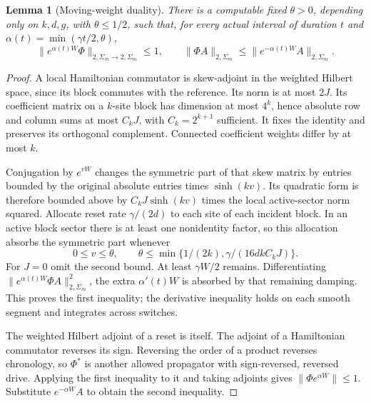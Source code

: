\documentclass[11pt,reqno]{amsart}
\numberwithin{equation}{section}
\newtheorem{lemma}[theorem]{Lemma}
\theoremstyle{definition}
\theoremstyle{remark}
\newcommand{\nn}[1]{\lVert#1\rVert}
\begin{document}
\begin{lemma}[Moving-weight duality]\label{lem:weight}
There is a computable fixed $\theta>0$, depending only on $k,d,g$, with $\theta\leq1/2$, such that, for every actual interval of duration $t$ and $\alpha(t)=\min(\gamma t/2,\theta)$,
\begin{equation}\label{eq:weight}
 \nn{e^{\alpha(t)W}\Phi}_{2,\Sigma_m\to2,\Sigma_m}\leq1,
 \qquad
 \nn{\Phi A}_{2,\Sigma_m}\leq\nn{e^{-\alpha(t)W}A}_{2,\Sigma_m}.
\end{equation}
\end{lemma}
\begin{proof}
A local Hamiltonian commutator is skew-adjoint in the weighted Hilbert space, since its block commutes with the reference. Its norm is at most $2J$. Its coefficient matrix on a $k$-site block has dimension at most $4^k$, hence absolute row and column sums at most $C_kJ$, with $C_k=2^{k+1}$ sufficient. It fixes the identity and preserves its orthogonal complement. Connected coefficient weights differ by at most $k$.

Conjugation by $e^{vW}$ changes the symmetric part of that skew matrix by entries bounded by the original absolute entries times $\sinh(kv)$. Its quadratic form is therefore bounded above by $C_kJ\sinh(kv)$ times the local active-sector norm squared. Allocate reset rate $\gamma/(2d)$ to each site of each incident block. In an active block sector there is at least one nonidentity factor, so this allocation absorbs the symmetric part whenever
\[
 0\leq v\leq\theta,\qquad
 \theta\leq\min\{1/(2k),\gamma/(16dkC_kJ)\}.
\]
For $J=0$ omit the second bound. At least $\gamma W/2$ remains. Differentiating $\nn{e^{\alpha(t)W}\Phi A}_{2,\Sigma_m}^2$, the extra $\alpha'(t)W$ is absorbed by that remaining damping. This proves the first inequality; the derivative inequality holds on each smooth segment and integrates across switches.

The weighted Hilbert adjoint of a reset is itself. The adjoint of a Hamiltonian commutator reverses its sign. Reversing the order of a product reverses chronology, so $\Phi^*$ is another allowed propagator with sign-reversed, reversed drive. Applying the first inequality to it and taking adjoints gives $\nn{\Phi e^{\alpha W}}\leq1$. Substitute $e^{-\alpha W}A$ to obtain the second inequality.
\end{proof}
\end{document}

